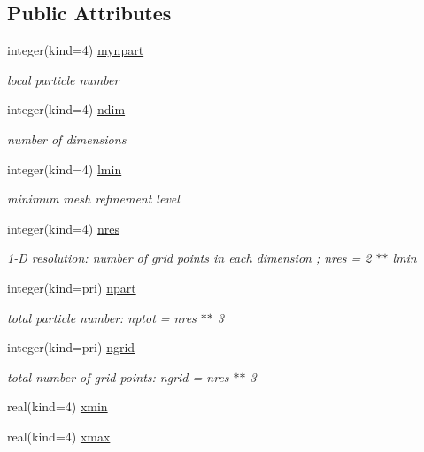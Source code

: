 \subsection*{Public Attributes}
\begin{DoxyCompactItemize}
\item 
integer(kind=4) \hyperlink{classmodvariables_a6b2f4aac9da282a26d2ff36628fa0c7b}{mynpart}
\begin{DoxyCompactList}\small\item\em local particle number \end{DoxyCompactList}\item 
integer(kind=4) \hyperlink{classmodvariables_a8047c27f346b34f664c6e5fc6a862d84}{ndim}
\begin{DoxyCompactList}\small\item\em number of dimensions \end{DoxyCompactList}\item 
integer(kind=4) \hyperlink{classmodvariables_ac0a0cf8631d5bf1592b35087a83ced9e}{lmin}
\begin{DoxyCompactList}\small\item\em minimum mesh refinement level \end{DoxyCompactList}\item 
integer(kind=4) \hyperlink{classmodvariables_aa678ff0ebe26f3b0510eba5a59a69e61}{nres}
\begin{DoxyCompactList}\small\item\em 1-\/\-D resolution\-: number of grid points in each dimension ; nres = 2 $\ast$$\ast$ lmin \end{DoxyCompactList}\item 
integer(kind=pri) \hyperlink{classmodvariables_a003cd4a3edf99a1c8f83cef4c61eb690}{npart}
\begin{DoxyCompactList}\small\item\em total particle number\-: nptot = nres $\ast$$\ast$ 3 \end{DoxyCompactList}\item 
integer(kind=pri) \hyperlink{classmodvariables_afeecc1a4b626f4eb8e48767dbf41d0a2}{ngrid}
\begin{DoxyCompactList}\small\item\em total number of grid points\-: ngrid = nres $\ast$$\ast$ 3 \end{DoxyCompactList}\item 
real(kind=4) \hyperlink{classmodvariables_aaa639d561a94ae000546755b6863b6be}{xmin}
\item 
real(kind=4) \hyperlink{classmodvariables_a9112a5edebd73d310c4594fca429a757}{xmax}

\end{DoxyCompactItemize}
